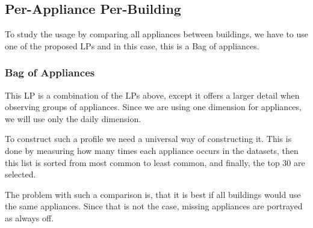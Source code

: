 


\subsection{Per-Appliance Per-Building}

To study the usage by comparing all appliances between buildings,
we have to use one of the proposed LPs and in this case, this is a Bag of appliances.

\subsubsection{Bag of Appliances}
This LP is a combination of the LPs above,
except it offers a larger detail when observing groups of appliances.
Since we are using one dimension for appliances, we will use only the daily dimension.

To construct such a profile we need a universal way of constructing it.
This is done by measuring how many times each appliance occurs in the datasets,
then this list is sorted from most common to least common, and finally, the top 30 are selected.

The problem with such a comparison is, that it is best 
if all buildings would use the same appliances.
Since that is not the case, missing appliances are portrayed as always off. 

